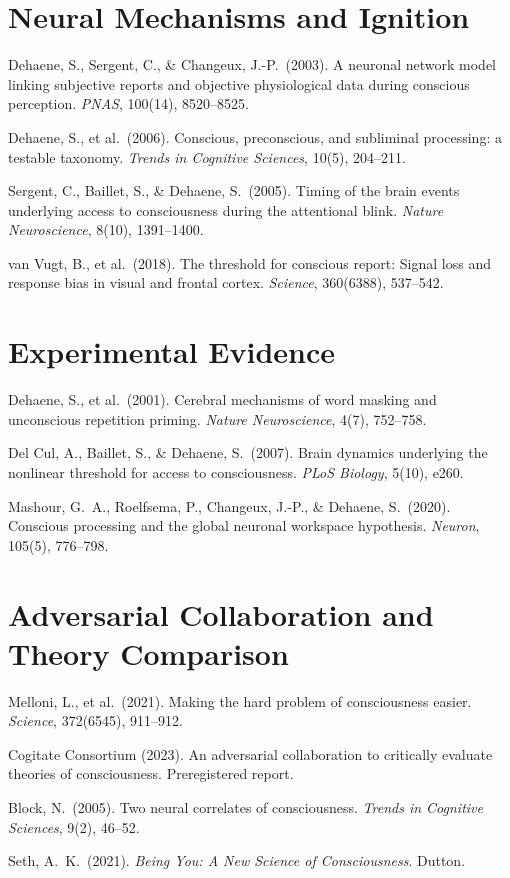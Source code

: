\documentclass[11pt,a4paper]{report}
\begin{document}
\section*{Neural Mechanisms and Ignition}
\begin{enumerate}[label={[\arabic*]}, leftmargin=2.5em, start=6]
  \item Dehaene, S., Sergent, C., \& Changeux, J.-P.\ (2003). A neuronal network model linking subjective reports and objective physiological data during conscious perception. \textit{PNAS}, 100(14), 8520--8525.
  \item Dehaene, S., et al.\ (2006). Conscious, preconscious, and subliminal processing: a testable taxonomy. \textit{Trends in Cognitive Sciences}, 10(5), 204--211.
  \item Sergent, C., Baillet, S., \& Dehaene, S.\ (2005). Timing of the brain events underlying access to consciousness during the attentional blink. \textit{Nature Neuroscience}, 8(10), 1391--1400.
  \item van Vugt, B., et al.\ (2018). The threshold for conscious report: Signal loss and response bias in visual and frontal cortex. \textit{Science}, 360(6388), 537--542.
\end{enumerate}

\section*{Experimental Evidence}
\begin{enumerate}[label={[\arabic*]}, leftmargin=2.5em, start=10]
  \item Dehaene, S., et al.\ (2001). Cerebral mechanisms of word masking and unconscious repetition priming. \textit{Nature Neuroscience}, 4(7), 752--758.
  \item Del Cul, A., Baillet, S., \& Dehaene, S.\ (2007). Brain dynamics underlying the nonlinear threshold for access to consciousness. \textit{PLoS Biology}, 5(10), e260.
  \item Mashour, G.\ A., Roelfsema, P., Changeux, J.-P., \& Dehaene, S.\ (2020). Conscious processing and the global neuronal workspace hypothesis. \textit{Neuron}, 105(5), 776--798.
\end{enumerate}

\section*{Adversarial Collaboration and Theory Comparison}
\begin{enumerate}[label={[\arabic*]}, leftmargin=2.5em, start=13]
  \item Melloni, L., et al.\ (2021). Making the hard problem of consciousness easier. \textit{Science}, 372(6545), 911--912.
  \item Cogitate Consortium (2023). An adversarial collaboration to critically evaluate theories of consciousness. Preregistered report.
  \item Block, N.\ (2005). Two neural correlates of consciousness. \textit{Trends in Cognitive Sciences}, 9(2), 46--52.
  \item Seth, A.\ K.\ (2021). \textit{Being You: A New Science of Consciousness}. Dutton.
\end{enumerate}
\end{document}
